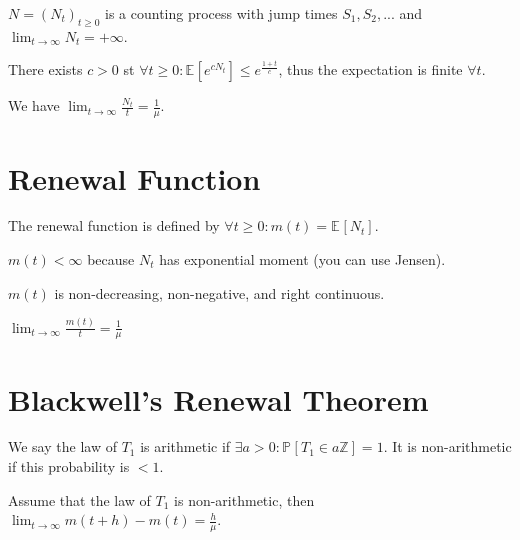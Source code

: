 \begin{prop}[]
	$N = (N_t)_{t\geq 0}$ is a counting process with jump times $S_1, S_2,...$ and $\lim_{t \to \infty} N_t = + \infty$.
\end{prop}

\begin{prop}[]
	There exists $c> 0$ st $\forall t\geq 0: \mathbb{E}_{} \left[ e^{cN_t} \right] \leq e^{\frac{1+t}{c}}$, thus the expectation is finite $\forall t$.
\end{prop}

\begin{theorem}
	We have $\lim_{t \to \infty} \frac{N_t}{t} = \frac{1}{\mu}$.
\end{theorem}

\section{Renewal Function}
\begin{defn}
	The renewal function is defined by $\forall t\geq 0: m(t) = \mathbb{E}_{} \left[ N_t \right] $.
\end{defn}

\begin{rmk}[]
	$m(t)<\infty$ because $N _t$ has exponential moment (you can use Jensen).
\end{rmk}

\begin{prop}[]
	$m(t)$ is non-decreasing, non-negative, and right continuous.
\end{prop}

\begin{theorem}
	$\lim_{t \to \infty} \frac{m(t)}{t}=\frac{1}{\mu }$
\end{theorem}

\section{Blackwell's Renewal Theorem}
\begin{defn}
	We say the law of $T_1$ is arithmetic if $\exists a > 0: \mathbb{P}_{} \left[ T_1 \in a \mathbb{Z} \right] =1$. It is non-arithmetic if this probability is $<1$.
\end{defn}

\begin{theorem}[Blackwell]
	Assume that the law of $T_1$ is non-arithmetic, then $\lim_{t \to \infty} m(t+h)-m(t) = \frac{h}{\mu }$.
\end{theorem}

